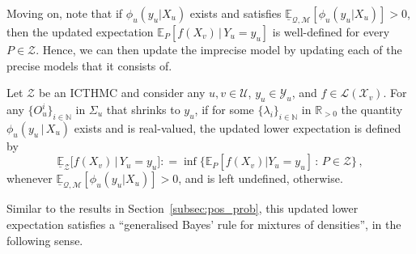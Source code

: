 \documentclass[twoside,11pt]{article}
\newcommand{\nats}{\mathbb{N}}
\newcommand{\reals}{\mathbb{R}}
\newcommand{\realspos}{\reals_{>0}}
\newcommand{\states}{\mathcal{X}}
\newcommand{\observs}{\mathcal{Y}}
\newcommand{\lexp}{\underline{\mathbb{E}}_{\rateset,\mathcal{M}}}
\newcommand{\gambles}{\mathcal{L}}
\newcommand{\rateset}{\mathcal{Q}}
\newcommand{\coloneqq}{:\!=}
\begin{document}

Moving on, note that if $\phi_u(y_u\vert X_u)$ exists and satisfies $\lexp[\phi_u(y_u\vert X_u)]>0$, then the updated expectation $\mathbb{E}_P[f(X_v)\,\vert\,Y_u=y_u]$ is well-defined for every $P\in\mathcal{Z}$. Hence, we can then update the imprecise model by updating each of the precise models that it consists of.
\begin{definition}\label{def:reg_ext_densities}
Let $\mathcal{Z}$ be an ICTHMC and consider any $u,v\in\mathcal{U}$, $y_u\in\observs_u$, and $f\in\gambles(\states_v)$. For any $\{O_u^i\}_{i\in\nats}$ in $\Sigma_u$ that shrinks to $y_u$, if for some $\{\lambda_i\}_{i\in\nats}$ in $\realspos$ the quantity $\phi_u(y_u\,\vert\,X_u)$ exists and is real-valued, the updated lower expectation is defined by
\begin{equation*}
\underline{\mathbb{E}}_{\mathcal{Z}}\bigl[f(X_v)\,\vert\,Y_u = y_u\bigr] \coloneqq \inf\{\mathbb{E}_P[f(X_v)\vert Y_u=y_u]\,:\,P\in\mathcal{Z}\}\,,
\end{equation*}
whenever $\lexp[\phi_u(y_u\vert X_u)] >0$, and is left undefined, otherwise.
\end{definition}

Similar to the results in Section~\ref{subsec:pos_prob}, this updated lower expectation satisfies a ``generalised Bayes' rule for mixtures of densities'', in the following sense.
\end{document}
